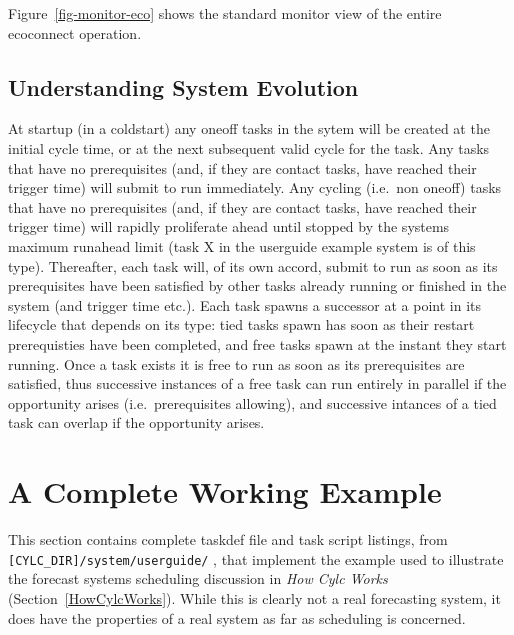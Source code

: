 \documentclass[11pt,a4paper]{article}
\begin{document}
Figure~\ref{fig-monitor-eco} shows the standard monitor view of the
entire ecoconnect operation.

\pagebreak

\subsection{Understanding System Evolution}
\label{UnderstandingSystemEvolution}

At startup (in a coldstart) any oneoff tasks in the sytem will be
created at the initial cycle time, or at the next subsequent valid cycle
for the task. Any tasks that have no prerequisites (and, if they are
contact tasks, have reached their trigger time) will submit to run
immediately. Any cycling (i.e.\ non oneoff) tasks that have no
prerequisites (and, if they are contact tasks, have reached their
trigger time) will rapidly proliferate ahead until stopped by the
systems maximum runahead limit (task X in the userguide example system
is of this type).  Thereafter, each task will, of its own accord, submit
to run as soon as its prerequisites have been satisfied by other tasks
already running or finished in the system (and trigger time etc.). 
Each task spawns a successor at a point in its lifecycle that depends on
its type: tied tasks spawn has soon as their restart prerequisties have
been completed, and free tasks spawn at the instant they start running. 
Once a task exists it is free to run as soon as its prerequisites are
satisfied, thus successive instances of a free task can run entirely in
parallel if the opportunity arises (i.e.\ prerequisites allowing), and 
successive intances of a tied task can overlap if the opportunity
arises.


\section{A Complete Working Example}
\label{ACompleteWorkingExample}

This section contains complete taskdef file and task script listings,
from \lstinline= [CYLC_DIR]/system/userguide/= , that implement the
example used to illustrate the forecast systems scheduling discussion in
{\em How Cylc Works} (Section~\ref{HowCylcWorks}).  While this is
clearly not a real forecasting system, it does have the properties of a
real system as far as scheduling is concerned.  



\end{document}
